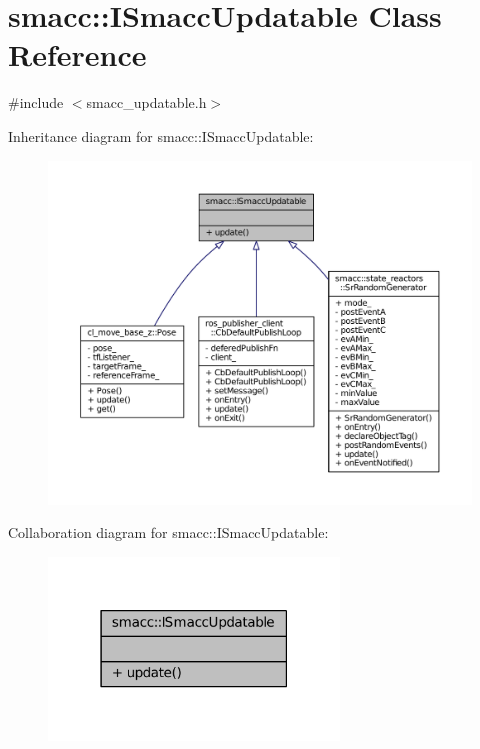 \hypertarget{classsmacc_1_1ISmaccUpdatable}{}\section{smacc\+:\+:I\+Smacc\+Updatable Class Reference}
\label{classsmacc_1_1ISmaccUpdatable}


{\ttfamily \#include $<$smacc\+\_\+updatable.\+h$>$}



Inheritance diagram for smacc\+:\+:I\+Smacc\+Updatable\+:
\nopagebreak
\begin{figure}[H]
\begin{center}
\leavevmode
\includegraphics[width=350pt]{classsmacc_1_1ISmaccUpdatable__inherit__graph}
\end{center}
\end{figure}


Collaboration diagram for smacc\+:\+:I\+Smacc\+Updatable\+:
\nopagebreak
\begin{figure}[H]
\begin{center}
\leavevmode
\includegraphics[width=219pt]{classsmacc_1_1ISmaccUpdatable__coll__graph}
\end{center}
\end{figure}
